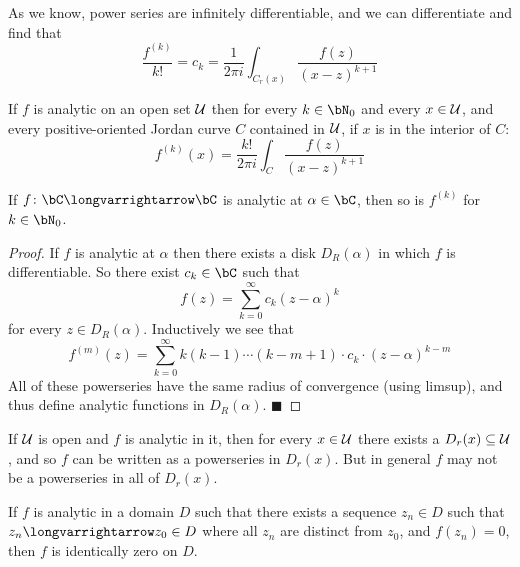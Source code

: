 \documentclass[10pt]{article}
\def\mU{{\cal U}}
\let\longto=\longvarrightarrow
\def\qed{\hskip1cm\hbox{}\hfill$\blacksquare$}
\begin{document}
As we know, power series are infinitely differentiable, and we can differentiate and find that
\[ \frac{f^{(k)}}{k!} = c_k = \frac1{2\pi i}\int_{C_r(x)}\frac{f(z)}{(x-z)^{k+1}} \]

\begin{thrm*}

    If $f$ is analytic on an open set $\mU$ then for every $k\in\bN_0$ and every $x\in\mU$, and every positive-oriented Jordan curve $C$ contained in $\mU$, if $x$ is in the interior of $C$:
    \[ f^{(k)}(x) = \frac{k!}{2\pi i}\int_C\frac{f(z)}{(x-z)^{k+1}} \]

\end{thrm*}

\begin{coro*}

    If $f\colon\bC\longto\bC$ is analytic at $\alpha\in\bC$, then so is $f^{(k)}$ for $k\in\bN_0$.

\end{coro*}

\begin{proof}

    If $f$ is analytic at $\alpha$ then there exists a disk $D_R(\alpha)$ in which $f$ is differentiable.
    So there exist $c_k\in\bC$ such that
    \[ f(z) = \sum_{k=0}^\infty c_k(z-\alpha)^k \]
    for every $z\in D_R(\alpha)$.
    Inductively we see that
    \[ f^{(m)}(z) = \sum_{k=0}^\infty k(k-1)\cdots(k-m+1)\cdot c_k\cdot(z-\alpha)^{k-m} \]
    All of these powerseries have the same radius of convergence (using limsup), and thus define analytic functions in $D_R(\alpha)$.
    \qed

\end{proof}

If $\mU$ is open and $f$ is analytic in it, then for every $x\in\mU$ there exists a $D_r(x)\subseteq\mU$, and so $f$ can be written as a powerseries in $D_r(x)$.
But in general $f$ may not be a powerseries in all of $D_r(x)$.

\begin{prop*}

    If $f$ is analytic in a domain $D$ such that there exists a sequence $z_n\in D$ such that $z_n\longto z_0\in D$ where all $z_n$ are distinct from $z_0$, and $f(z_n)=0$, then $f$ is identically zero on
    $D$.

\end{prop*}
\end{document}
